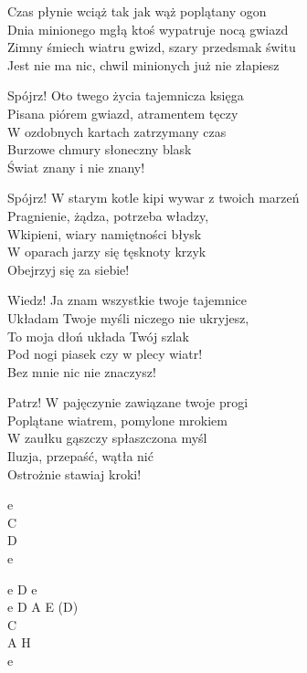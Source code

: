 \begin{text}
    \vin Czas płynie wciąż tak jak wąż poplątany ogon\\
    \vin Dnia minionego mgłą ktoś wypatruje nocą gwiazd\\
    \vin Zimny śmiech wiatru gwizd, szary przedsmak świtu\\
    \vin Jest nie ma nic, chwil minionych już nie złapiesz

    Spójrz! Oto twego życia tajemnicza księga\\
    Pisana piórem gwiazd, atramentem tęczy\\
    W ozdobnych kartach zatrzymany czas\\
    Burzowe chmury  słoneczny blask\\
    Świat znany i nie znany!

    Spójrz! W starym kotle kipi wywar z twoich marzeń\\
    Pragnienie, żądza, potrzeba władzy,\\
    Wkipieni, wiary namiętności błysk\\
    W oparach jarzy się tęsknoty krzyk\\
    Obejrzyj się za siebie!

    Wiedz! Ja znam wszystkie twoje tajemnice\\
    Układam Twoje myśli niczego nie ukryjesz,\\
    To moja dłoń układa Twój szlak\\
    Pod nogi piasek czy w plecy wiatr!\\
    Bez mnie nic nie znaczysz!

    Patrz! W pajęczynie zawiązane twoje progi\\
    Poplątane wiatrem, pomylone mrokiem\\
    W zaułku gąszczy spłaszczona myśl\\
    Iluzja, przepaść, wątła nić\\
    Ostrożnie stawiaj kroki!
\end{text}
\begin{chord}
    e\\
    C\\
    D\\
    e

    e D e\\
    e D A E (D)\\
    C\\
    A H\\
    e
\end{chord}